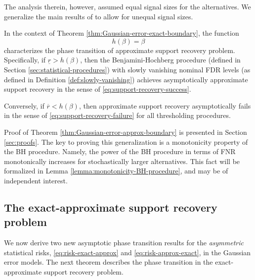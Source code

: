The analysis therein, however, assumed equal signal sizes for the alternatives.
We generalize the main results of \citet{arias2017distribution} to allow for unequal signal sizes.

\begin{theorem} \label{thm:Gaussian-error-approx-boundary}
In the context of Theorem \ref{thm:Gaussian-error-exact-boundary}, the function 
\begin{equation} \label{eq:approx-boundary-Gaussian}
    h(\beta) = \beta
\end{equation}
characterizes the phase transition of approximate support recovery problem.
Specifically, if $\underline{r} > {h}(\beta)$, then the Benjamini-Hochberg procedure (defined in Section \ref{sec:statistical-procedures}) with slowly vanishing nominal FDR levels (as defined in Definition \ref{def:slowly-vanishing}) achieves asymptotically approximate support recovery in the sense of \eqref{eq:support-recovery-success}. 

Conversely, if $\overline{r} < {h}(\beta)$, then approximate support recovery asymptotically fails in the sense of \eqref{eq:support-recovery-failure} for all thresholding procedures.
\end{theorem}

Proof of Theorem \ref{thm:Gaussian-error-approx-boundary} is presented in Section \ref{sec:proofs}. 
The key to proving this generalization is a monotonicity property of the \ac{BH} procedure. 
Namely, the power of the \ac{BH} procedure in terms of FNR monotonically increases for stochastically larger alternatives.
This fact will be formalized in Lemma \ref{lemma:monotonicity-BH-procedure}, and may be of independent interest.

\subsection{The exact-approximate support recovery problem}
\label{subsec:exact-approx-support-recovery-Gaussian}

We now derive two new asymptotic phase transition results for the \emph{asymmetric} statistical risks, \eqref{eq:risk-exact-approx} and \eqref{eq:risk-approx-exact}, in the Gaussian error models.
The next theorem describes the phase transition in the exact-approximate support recovery problem.

